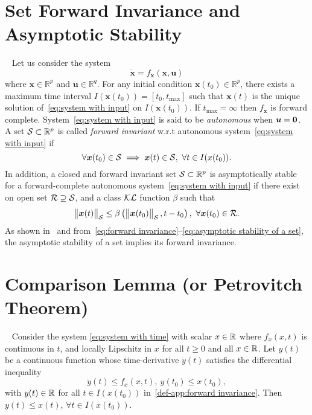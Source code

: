 \section{Set Forward Invariance and Asymptotic Stability}\label{sec-app:forward invariance}
\begin{definition}\label{def-app:forward invariance}
	~\cite{blanchini1999automatica,xu2015ifac}
	Let us consider the system 
	\begin{equation}\label{eq:system with input}
		\bm{\dot{x}} = f_{\bm{x}} (\bm{x},\bm{u})
	\end{equation} 
	where $\bm{x}\in\mathbb{R}^p$ and $\bm{u}\in\mathbb{R}^q$. 
	For any initial condition $\bm{x}(t_0)\in\mathbb{R}^p$, there exists a maximum time interval $I(\bm{x}(t_0))=[t_0,t_{\max}]$ such that $\bm{x}(t)$ is the unique solution of~\cref{eq:system with input} on $I(\bm{x}(t_0))$. If $t_{\max}=\infty$ then $f_{\bm{x}}$ is forward complete. System~\cref{eq:system with input} is said to be \emph{autonomous} when $\bm{u}=\mathbf{0}$.  A set ${\cal S}\subset\mathbb{R}^p$ is called \emph{forward invariant} w.r.t autonomous system~\cref{eq:system with input} if 
	\begin{equation}\label{eq:forward invariance}
		\forall \bm{x}(t_0)\in\setS \implies \bm{x}(t)\in\setS, \ \forall t\in I(x(t_0)). 
	\end{equation}
	In addition, a closed and forward invariant set ${{\cal S}}\subset\mathbb{R}^p$ is asymptotically stable for a forward-complete autonomous system~\cref{eq:system with input} if there exist on open set $\cal R\supseteq{\cal S}$, and a class ${\cal KL}$ function $\beta$ such that
	\begin{equation}\label{eq:asymptotic stability of a set}
		\begin{Vmatrix} \bm{x}(t) \end{Vmatrix}_{{\cal S}}\leq\beta\left(\begin{Vmatrix} \bm{x}(t_0) \end{Vmatrix}_{{\cal S}},t-t_0\right), \ \forall\bm{x}(t_0)\in\cal R.
	\end{equation}
	As shown in~\cite{xu2015ifac} and from~\cref{eq:forward invariance}--\cref{eq:asymptotic stability of a set}, the asymptotic stability of a set implies its forward invariance.
\end{definition}
\section{Comparison Lemma (or Petrovitch Theorem)}\label{app:comparison lemma}
\begin{lemma}\label{def-app:comparison lemma}~\cite{khalil2002NonLinearSystems,mitrinovic1991inequalityBook}
	Consider the system \cref{eq:system with time} with scalar $x\in \mathbb{R}$ where $f_{{x}}({x},t)$ is continuous in $t$, and locally Lipschitz in ${x}$ for all $t\geq0$ and all ${x}\in \mathbb{R}$. Let $y(t)$ be a continuous function whose time-derivative $\dot{y}(t)$ satisfies the differential inequality
	\begin{equation}
		\dot{y}(t) \leq f_{{x}}({x},t), \ y(t_0) \leq x(t_0),
	\end{equation}
	with $y(t)\in \mathbb{R}$ for all $t\in I(x(t_0))$  in~\cref{def-app:forward invariance}. Then $y(t)\leq x(t)$, $\forall t\in I(x(t_0))$.
\end{lemma}
